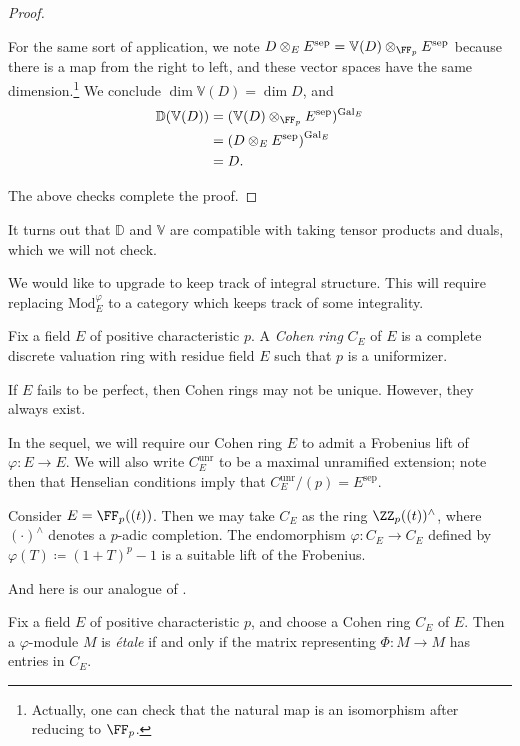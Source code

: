 \documentclass{article}
\begin{document}
\begin{proof}
\begin{itemize}
		For the same sort of application, we note $D\otimes_EE^{\mathrm{sep}}=\mathbb V(D)\otimes_{\FF_p}E^{\mathrm{sep}}$ because there is a map from the right to left, and these vector spaces have the same dimension.\footnote{Actually, one can check that the natural map is an isomorphism after reducing to $\FF_p$.} We conclude $\dim\mathbb V(D)=\dim D$, and
		\begin{align*}
			\mathbb D(\mathbb V(D)) &= (\mathbb V(D)\otimes_{\FF_p}E^{\mathrm{sep}})^{\mathrm{Gal}_E} \\
			&= \left(D\otimes_EE^{\mathrm{sep}}\right)^{\mathrm{Gal}_E} \\
			&= D.
		\end{align*}
	\end{itemize}
	The above checks complete the proof.
\end{proof}
\begin{remark}
	It turns out that $\mathbb D$ and $\mathbb V$ are compatible with taking tensor products and duals, which we will not check.
\end{remark}
We would like to upgrade  to keep track of integral structure. This will require replacing $\mathrm{Mod}_E^\varphi$ to a category which keeps track of some integrality.
\begin{definition}
	Fix a field $E$ of positive characteristic $p$. A \textit{Cohen ring} $C_E$ of $E$ is a complete discrete valuation ring with residue field $E$ such that $p$ is a uniformizer.
\end{definition}
\begin{remark}
	If $E$ fails to be perfect, then Cohen rings may not be unique. However, they always exist.
\end{remark}
In the sequel, we will require our Cohen ring $E$ to admit a Frobenius lift of $\varphi\colon E\to E$. We will also write $C_E^{\mathrm{unr}}$ to be a maximal unramified extension; note then that Henselian conditions imply that $C_E^{\mathrm{unr}}/(p)=E^{\mathrm{sep}}$.
\begin{example}
	Consider $E=\FF_p((t))$. Then we may take $C_E$ as the ring $\ZZ_p((t))^{\land}$, where $(\cdot)^\land$ denotes a $p$-adic completion. The endomorphism $\varphi\colon C_E\to C_E$ defined by $\varphi(T)\coloneqq(1+T)^p-1$ is a suitable lift of the Frobenius.
\end{example}
And here is our analogue of .
\begin{definition}[\'etale]
	Fix a field $E$ of positive characteristic $p$, and choose a Cohen ring $C_E$ of $E$. Then a $\varphi$-module $M$ is \textit{\'etale} if and only if the matrix representing $\Phi\colon M\to M$ has entries in $C_E$.
\end{definition}
\end{document}
